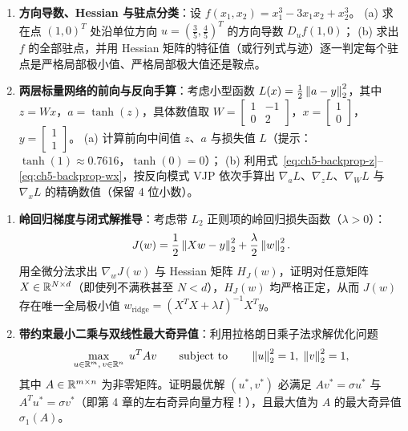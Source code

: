 \begin{enumerate}[label=\textbf{5.\arabic*}, resume]
  \item \textbf{方向导数、Hessian 与驻点分类}：设 $f(x_1, x_2) = x_1^3 - 3x_1 x_2 + x_2^3$。
  (a) 求在点 $(1, 0)^T$ 处沿单位方向 $u = (\frac{3}{5}, \frac{4}{5})^T$ 的方向导数 $D_u f(1,0)$；
  (b) 求出 $f$ 的全部驻点，并用 Hessian 矩阵的特征值（或行列式与迹）逐一判定每个驻点是严格局部极小值、严格局部极大值还是鞍点。

  \item \textbf{两层标量网络的前向与反向手算}：考虑小型函数 $L(x) = \frac{1}{2}\left\|a - y\right\|_2^2$，其中 $z = Wx$，$a = \tanh(z)$，具体数值取 $W = \begin{bmatrix} 1 & -1 \\ 0 & 2 \end{bmatrix}$，$x = \begin{bmatrix} 1 \\ 0 \end{bmatrix}$，$y = \begin{bmatrix} 1 \\ 1 \end{bmatrix}$。
  (a) 计算前向中间值 $z$、$a$ 与损失值 $L$（提示：$\tanh(1)\approx 0.7616$，$\tanh(0)=0$）；
  (b) 利用式~\eqref{eq:ch5-backprop-z}--\eqref{eq:ch5-backprop-wx}，按反向模式 VJP 依次手算出 $\nabla_a L$、$\nabla_z L$、$\nabla_W L$ 与 $\nabla_x L$ 的精确数值（保留 4 位小数）。
\end{enumerate}

\begin{enumerate}[label=\textbf{5.\arabic*}, resume]
  \item \textbf{岭回归梯度与闭式解推导}：考虑带 $L_2$ 正则项的岭回归损失函数（$\lambda > 0$）：
  \[
    J(w) = \frac{1}{2}\left\|Xw - y\right\|_2^2 + \frac{\lambda}{2}\left\|w\right\|_2^2.
  \]
  用全微分法求出 $\nabla_w J(w)$ 与 Hessian 矩阵 $H_J(w)$，证明对任意矩阵 $X\in\mathbb{R}^{N\times d}$（即使列不满秩甚至 $N < d$），$H_J(w)$ 均严格正定，从而 $J(w)$ 存在唯一全局极小值 $w_{\text{ridge}} = (X^T X + \lambda I)^{-1} X^T y$。

  \item \textbf{带约束最小二乘与双线性最大奇异值}：利用拉格朗日乘子法求解优化问题
  \[
    \max_{u\in\mathbb{R}^m,\, v\in\mathbb{R}^n}\; u^T A v \qquad \text{subject to}\qquad \left\|u\right\|_2^2 = 1,\; \left\|v\right\|_2^2 = 1,
  \]
  其中 $A\in\mathbb{R}^{m\times n}$ 为非零矩阵。证明最优解 $(u^*, v^*)$ 必满足 $A v^* = \sigma u^*$ 与 $A^T u^* = \sigma v^*$（即第 4 章的左右奇异向量方程！），且最大值为 $A$ 的最大奇异值 $\sigma_1(A)$。
\end{enumerate}

